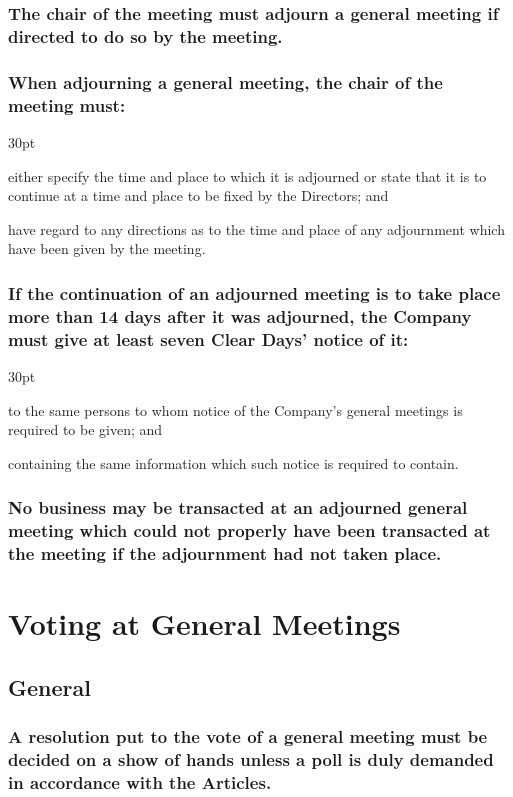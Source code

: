 \documentclass[12pt]{article}
\def\clauseindent{30pt}
\newenvironment{subindentpara}{\begin{adjustwidth}{\clauseindent}{}\begin{hanginglist}}{\end{hanginglist}\end{adjustwidth}}
\begin{document}
\subsubsection{The chair of the meeting must adjourn a general meeting if directed to do so by the meeting.}
\subsubsection{When adjourning a general meeting, the chair of the meeting must:}
\begin{subindentpara}
    \item either specify the time and place to which it is adjourned or state that it is to continue at a time and place to be fixed by the Directors; and
    \item have regard to any directions as to the time and place of any adjournment which have been given by the meeting.
\end{subindentpara}
\subsubsection{If the continuation of an adjourned meeting is to take place more than 14 days after it was adjourned, the Company must give at least seven Clear Days' notice of it:}
\begin{subindentpara}
    \item to the same persons to whom notice of the Company's general meetings is required to be given; and
    \item containing the same information which such notice is required to contain.
\end{subindentpara}
\subsubsection{No business may be transacted at an adjourned general meeting which could not properly have been transacted at the meeting if the adjournment had not taken place.}

\section*{Voting at General Meetings}
\subsection{General}
\subsubsection{A resolution put to the vote of a general meeting must be decided on a show of hands unless a poll is duly demanded in accordance with the Articles.}
\end{document}
